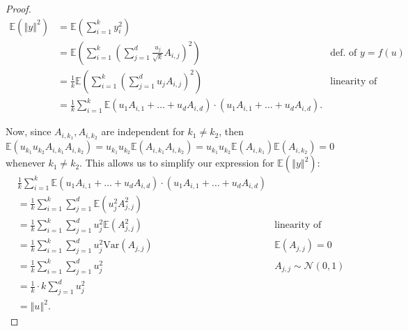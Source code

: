 \documentclass{article}
\begin{document}
     \begin{proof}
     \begin{align*}
         \mathbb{E}(\left\Vert y \right\Vert^2) &= \mathbb{E} \left(\sum_{i=1}^k y_i^2\right)\\
         &= \mathbb{E} \left(\sum_{i=1}^k \left( \sum_{j=1}^d \frac{u_j}{\sqrt{k}}A_{i,j} \right)^2\right) &\text{def. of $y = f(u)$}\\
         &= \frac{1}{k} \mathbb{E} \left(\sum_{i=1}^k \left( \sum_{j=1}^d u_j A_{i,j} \right)^2\right) &\text{linearity of expectation}\\
         &= \frac{1}{k} \sum_{i=1}^k \mathbb{E} (u_1A_{i,1} + \ldots + u_dA_{i,d}) \cdot (u_1A_{i,1} + \ldots + u_dA_{i,d}).
     \end{align*}
     
     Now, since $A_{i,k_1}, A_{i,k_2}$ are independent for $k_1 \neq k_2$, then $\mathbb{E}(u_{k_1}u_{k_2}A_{i,k_1}A_{i,k_2}) = u_{k_1}u_{k_2} \mathbb{E}(A_{i,k_1}A_{i,k_2}) = u_{k_1}u_{k_2} \mathbb{E}(A_{i,k_1})\mathbb{E}(A_{i,k_2}) = 0$ whenever $k_1 \neq k_2$. This allows us to simplify our expression for $\mathbb{E}(\left\Vert y \right\Vert^2)$:
     \begin{align*}
         &\frac{1}{k} \sum_{i=1}^k \mathbb{E} (u_1A_{i,1} + \ldots + u_dA_{i,d}) \cdot (u_1A_{i,1} + \ldots + u_dA_{i,d})\\
         &= \frac{1}{k} \sum_{i=1}^k \sum_{j=1}^d \mathbb{E}(u_j^2 A_{j,j}^2)\\
         &= \frac{1}{k} \sum_{i=1}^k \sum_{j=1}^d u_j^2 \mathbb{E}(A_{j,j}^2) &\text{linearity of expectation}\\
         &= \frac{1}{k} \sum_{i=1}^k \sum_{j=1}^d u_j^2 \text{Var}(A_{j,j}) & \mathbb{E}(A_{j,j}) = 0\\
         &= \frac{1}{k} \sum_{i=1}^k \sum_{j=1}^d u_j^2 &A_{j,j} \sim \mathcal{N}(0,1)\\
         &= \frac{1}{k} \cdot k \sum_{j=1}^d u_j^2\\
         &= \left\Vert u \right\Vert^2.
     \end{align*}
     \end{proof}
\end{document}

